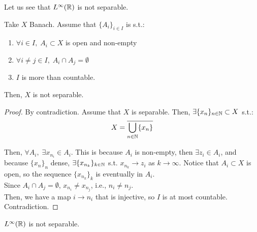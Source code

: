 \vspace{1em}

\begin{note}
    Let us see that $L^{\infty}(\mathbb{R})$ is not separable.\\
\end{note}

\begin{flemma}
    Take $X$ Banach. Assume that $\{A_i\}_{i \in I}$ is s.t.:
    \vspace{1em}
    \begin{enumerate}[label=(\alph*)]
        \item $\forall i \in I, \; A_i \subset X$ is open and non-empty
        \vspace{1em}
        \item $\forall i \neq j \in I, \; A_i \cap A_j = \emptyset$
        \vspace{1em}
        \item $I$ is more than countable.
    \end{enumerate}

    Then, $X$ is not separable.
\end{flemma}

\begin{proof}
    By contradiction. Assume that $X$ is separable. Then, $\exists \{x_n\}_{n \in \mathbb{N}} \subset X$ s.t.:
    $$X = \overline{\bigcup_{n \in \mathbb{N}} \{x_n\}}$$

    Then, $\forall A_i, \; \exists x_{n_i} \in A_i$. 
    This is because $A_i$ is non-empty, then $\exists z_i \in A_i$, and 
    because $\{x_n\}_n$ dense, $\exists \{x_{n_k}\}_{k \in \mathbb{N}}$ s.t. $x_{n_k} \to z_i$ as $k \to \infty$.
    Notice that $A_i \subset X$ is open, so the sequence $\{x_{n_k}\}_k$ is eventually in $A_i$.\\
    
    Since $A_i \cap A_j = \emptyset$,
    $x_{n_i} \neq x_{n_j}$, i.e., $n_i \neq n_j$.\\

    Then, we have a map $i \to n_i$ that is injective, so $I$ is at most countable. Contradiction.

\end{proof}

\begin{ftheorem}
    $L^{\infty}(\mathbb{R})$ is not separable.
\end{ftheorem}

